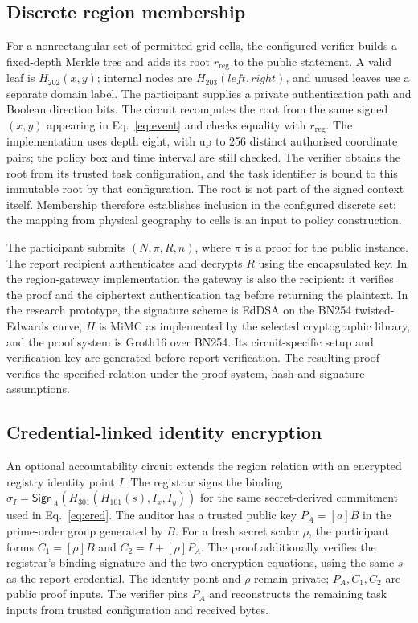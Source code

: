 \documentclass[pdflatex,iicol,sn-mathphys-num]{sn-jnl}
\begin{document}
\subsection{Discrete region membership}
For a nonrectangular set of permitted grid cells, the configured verifier builds a fixed-depth Merkle tree and adds its root $r_{\mathrm{reg}}$ to the public statement. A valid leaf is $H_{202}(x,y)$; internal nodes are $H_{203}(\mathit{left},\mathit{right})$, and unused leaves use a separate domain label. The participant supplies a private authentication path and Boolean direction bits. The circuit recomputes the root from the same signed $(x,y)$ appearing in Eq.~\eqref{eq:event} and checks equality with $r_{\mathrm{reg}}$. The implementation uses depth eight, with up to 256 distinct authorised coordinate pairs; the policy box and time interval are still checked. The verifier obtains the root from its trusted task configuration, and the task identifier is bound to this immutable root by that configuration. The root is not part of the signed context itself. Membership therefore establishes inclusion in the configured discrete set; the mapping from physical geography to cells is an input to policy construction.

The participant submits $(N,\pi,R,n)$, where $\pi$ is a proof for the public instance. The report recipient authenticates and decrypts $R$ using the encapsulated key. In the region-gateway implementation the gateway is also the recipient: it verifies the proof and the ciphertext authentication tag before returning the plaintext. In the research prototype, the signature scheme is EdDSA on the BN254 twisted-Edwards curve, $H$ is MiMC as implemented by the selected cryptographic library, and the proof system is Groth16 over BN254. Its circuit-specific setup and verification key are generated before report verification. The resulting proof verifies the specified relation under the proof-system, hash and signature assumptions.

\subsection{Credential-linked identity encryption}
An optional accountability circuit extends the region relation with an encrypted registry identity point $I$. The registrar signs the binding $\sigma_I=\mathsf{Sign}_A(H_{301}(H_{101}(s),I_x,I_y))$ for the same secret-derived commitment used in Eq.~\eqref{eq:cred}. The auditor has a trusted public key $P_A=[a]B$ in the prime-order group generated by $B$. For a fresh secret scalar $\rho$, the participant forms $C_1=[\rho]B$ and $C_2=I+[\rho]P_A$. The proof additionally verifies the registrar's binding signature and the two encryption equations, using the same $s$ as the report credential. The identity point and $\rho$ remain private; $P_A,C_1,C_2$ are public proof inputs. The verifier pins $P_A$ and reconstructs the remaining task inputs from trusted configuration and received bytes.
\end{document}
